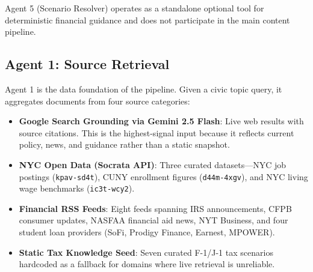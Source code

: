 \documentclass[12pt, letterpaper]{article}
\begin{document}

Agent 5 (Scenario Resolver) operates as a standalone optional tool for deterministic
financial guidance and does not participate in the main content pipeline.

\subsection{Agent 1: Source Retrieval}

Agent 1 is the data foundation of the pipeline. Given a civic topic query, it
aggregates documents from four source categories:

\begin{itemize}[leftmargin=1.5em]
  \item \textbf{Google Search Grounding via Gemini 2.5 Flash}: Live web results
    with source citations. This is the highest-signal input because it reflects
    current policy, news, and guidance rather than a static snapshot.
  \item \textbf{NYC Open Data (Socrata API)}: Three curated datasets---NYC job
    postings (\texttt{kpav-sd4t}), CUNY enrollment figures (\texttt{d44m-4xgv}),
    and NYC living wage benchmarks (\texttt{ic3t-wcy2}).
  \item \textbf{Financial RSS Feeds}: Eight feeds spanning IRS announcements, CFPB
    consumer updates, NASFAA financial aid news, NYT Business, and four student
    loan providers (SoFi, Prodigy Finance, Earnest, MPOWER).
  \item \textbf{Static Tax Knowledge Seed}: Seven curated F-1/J-1 tax scenarios
    hardcoded as a fallback for domains where live retrieval is unreliable.
\end{itemize}
\end{document}
